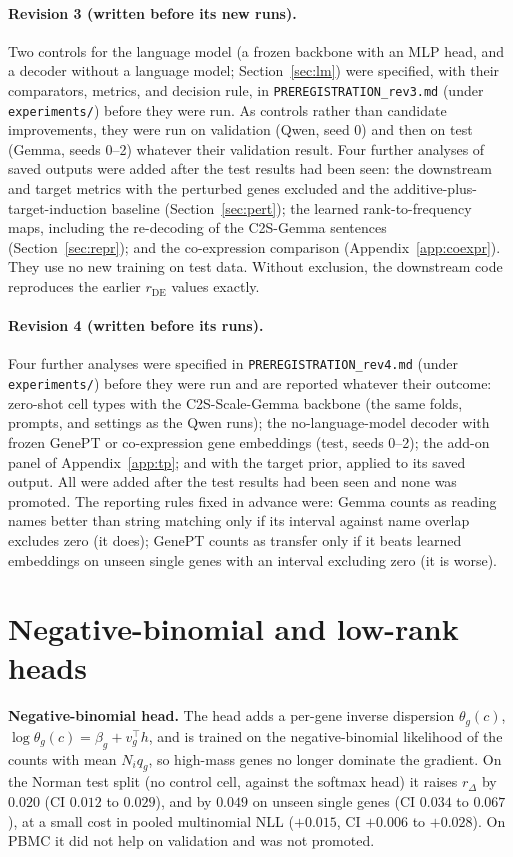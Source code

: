 \paragraph{Revision 3 (written before its new runs).} Two controls for the language model (a frozen backbone with an MLP head, and a decoder without a language model; Section~\ref{sec:lm}) were specified, with their comparators, metrics, and decision rule, in \texttt{PREREGISTRATION\_rev3.md} (under \texttt{experiments/}) before they were run. As controls rather than candidate improvements, they were run on validation (Qwen, seed 0) and then on test (Gemma, seeds 0--2) whatever their validation result. Four further analyses of saved outputs were added after the test results had been seen: the downstream and target metrics with the perturbed genes excluded and the additive-plus-target-induction baseline (Section~\ref{sec:pert}); the learned rank-to-frequency maps, including the re-decoding of the C2S-Gemma sentences (Section~\ref{sec:repr}); and the co-expression comparison (Appendix~\ref{app:coexpr}). They use no new training on test data. Without exclusion, the downstream code reproduces the earlier $r_{\mathrm{DE}}$ values exactly.

\paragraph{Revision 4 (written before its runs).} Four further analyses were specified in \texttt{PREREGISTRATION\_rev4.md} (under \texttt{experiments/}) before they were run and are reported whatever their outcome: zero-shot cell types with the C2S-Scale-Gemma backbone (the same folds, prompts, and settings as the Qwen runs); the no-language-model decoder with frozen GenePT or co-expression gene embeddings (test, seeds 0--2); the add-on panel of Appendix~\ref{app:tp}; and \cad{} with the target prior, applied to its saved output. All were added after the test results had been seen and none was promoted. The reporting rules fixed in advance were: Gemma counts as reading names better than string matching only if its interval against name overlap excludes zero (it does); GenePT counts as transfer only if it beats learned embeddings on unseen single genes with an interval excluding zero (it is worse).

\FloatBarrier
\section{Negative-binomial and low-rank heads}\label{app:heads}
\textbf{Negative-binomial head.} The head adds a per-gene inverse dispersion $\theta_g(c)$, $\log\theta_g(c)=\beta_g+v_g^\top h$, and is trained on the negative-binomial likelihood of the counts with mean $N_iq_g$, so high-mass genes no longer dominate the gradient. On the Norman test split (no control cell, against the softmax head) it raises $r_\Delta$ by $0.020$ (CI $0.012$ to $0.029$), and by $0.049$ on unseen single genes (CI $0.034$ to $0.067$), at a small cost in pooled multinomial NLL ($+0.015$, CI $+0.006$ to $+0.028$). On PBMC it did not help on validation and was not promoted.

